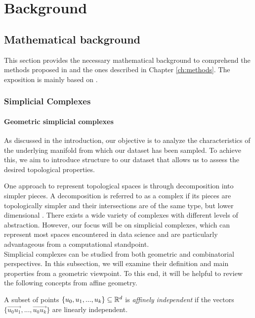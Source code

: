 \documentclass[../main.tex]{subfiles}
\begin{document}
\chapter{Background}
\label{ch:background}

\section{Mathematical background}
\label{sec:tda}
This section provides the necessary mathematical background to comprehend the methods proposed in \cite{hofer_densified_2021, moschella_relative_2022} and the ones described in Chapter \ref{ch:methods}. The exposition is mainly based on \cite{edelsbrunner_computational_2010}.

\subsection{Simplicial Complexes}
\subsubsection*{Geometric simplicial complexes}

As discussed in the introduction, our objective is to analyze the characteristics of the underlying manifold from which our dataset has been sampled. To achieve this, we aim to introduce structure to our dataset that allows us to assess the desired topological properties.

One approach to represent topological spaces is through decomposition into simpler pieces. A decomposition is referred to as a complex if its pieces are topologically simpler and their intersections are of the same type, but lower dimensional \cite{edelsbrunner_computational_2010}. There exists a wide variety of complexes with different levels of abstraction. However, our focus will be on simplicial complexes, which can represent most spaces encountered in data science and are particularly advantageous from a computational standpoint.\\

Simplicial complexes can be studied from both geometric and combinatorial perspectives. In this subsection, we will examine their definition and main properties from a geometric viewpoint. To this end, it will be helpful to review the following concepts from affine geometry.

\begin{definition}
A subset of points $\{u_0, u_1, ..., u_k\} \subseteq \mathbb{R}^d$ is \emph{affinely independent} if the vectors $\{\overrightarrow{u_0u_1}, ..., \overrightarrow{u_0u_k}\}$ are linearly independent.
\end{definition}
\end{document}
